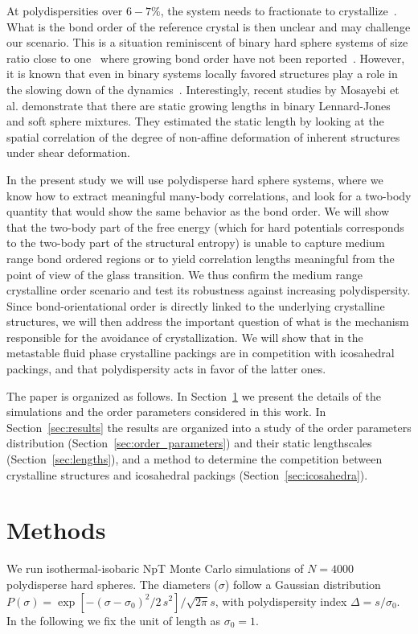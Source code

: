 \documentclass[twocolumn,superscriptaddress]{revtex4}
\begin{document}
At polydispersities over $6-7\%$, the system needs to fractionate to crystallize~\citep{Fasolo2003}. What is the bond order of the reference crystal is then unclear and may challenge our scenario. This is a situation reminiscent of binary hard sphere systems of size ratio close to one~\cite{Hopkins2011b,Hopkins2012} where growing bond order have not been reported~\cite{Charbonneau}. However, it is known that even in binary systems locally favored structures play a role in the slowing down of the dynamics~\cite{Coslovich2011,Malins2012}. Interestingly, recent studies by Mosayebi et al. \cite{mosayebi2010,mosayebi2012} demonstrate that there are static growing lengths 
in binary Lennard-Jones and soft sphere mixtures. They estimated the static length by looking at the spatial correlation of the degree of non-affine deformation 
of inherent structures under shear deformation. 

In the present study we will use polydisperse hard sphere systems, where we know how to extract meaningful many-body correlations, and look for a two-body quantity that would show the same behavior as the bond order. We will show that the two-body part of the free energy (which for hard potentials corresponds to the two-body part of the structural entropy) is unable to capture medium range bond ordered regions or to yield correlation lengths meaningful from the point of view of the glass transition. We thus confirm the medium range crystalline order scenario and test its robustness against increasing polydispersity.
Since bond-orientational order is directly linked to the underlying crystalline structures, we will then address the important question
of what is the mechanism responsible for the avoidance of crystallization. We will show that in the metastable fluid phase crystalline packings
are in competition with icosahedral packings, and that polydispersity acts in favor of the latter ones.

The paper is organized as follows. In Section~\ref{sec:methods} we present the details of the simulations and the order parameters considered in this work. In Section~\ref{sec:results} the results are organized into
a study of the order parameters distribution (Section~\ref{sec:order_parameters}) and their static lengthscales (Section~\ref{sec:lengths}), and a method to determine the competition between crystalline structures
and icosahedral packings (Section~\ref{sec:icosahedra}).

\section{Methods}\label{sec:methods}
We run isothermal-isobaric NpT Monte Carlo simulations of $N=4000$ polydisperse hard spheres.
The diameters ($\sigma$) follow a Gaussian distribution $P(\sigma)=\exp{\left[-(\sigma-\sigma_0)^2/2\,s^2\right]}/\sqrt{2\pi} s$,
with polydispersity index $\Delta=s/\sigma_0$. In the following we fix the unit of length as $\sigma_0=1$.
\end{document}

